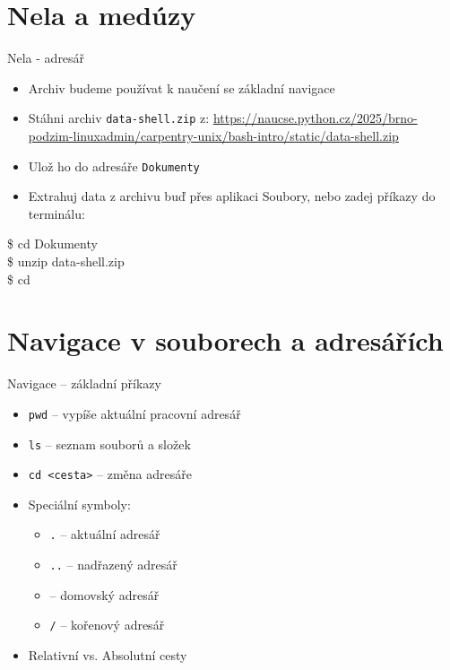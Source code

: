 \documentclass{beamer}
\newcommand{\ts}{\raisebox{-0.25em}{\textasciitilde}}
\begin{document}
\section{Nela a medúzy}
\begin{frame}{Nela - adresář}
  \begin{itemize}
    \item Archiv budeme používat k naučení se základní navigace
    \item Stáhni archiv \texttt{data-shell.zip} z:
    \url{https://naucse.python.cz/2025/brno-podzim-linuxadmin/carpentry-unix/bash-intro/static/data-shell.zip}
    \item Ulož ho do adresáře \texttt{Dokumenty}
    \item Extrahuj data z archivu buď přes aplikaci Soubory, nebo zadej příkazy do terminálu:
  \end{itemize}

    \vspace{0.5em}
	{\ttfamily\small
		\$ cd Dokumenty \\
		\$ unzip data-shell.zip \\
		\$ cd \\
	}

\end{frame}


  \section{Navigace v souborech a adresářích}
  \begin{frame}{Navigace – základní příkazy}
    \begin{itemize}
      \item \texttt{pwd} – vypíše aktuální pracovní adresář
      \item \texttt{ls} – seznam souborů a složek
      \item \texttt{cd <cesta>} – změna adresáře
          \vspace{0.5em}
      \item Speciální symboly:
        \begin{itemize}
          \item \texttt{.} – aktuální adresář
          \item \texttt{..} – nadřazený adresář
          \item \texttt{\ts} – domovský adresář
          \item \texttt{/} – kořenový adresář
        \end{itemize}
            \vspace{0.5em}
      \item Relativní vs. Absolutní cesty
    \end{itemize}
  \end{frame}
\end{document}
